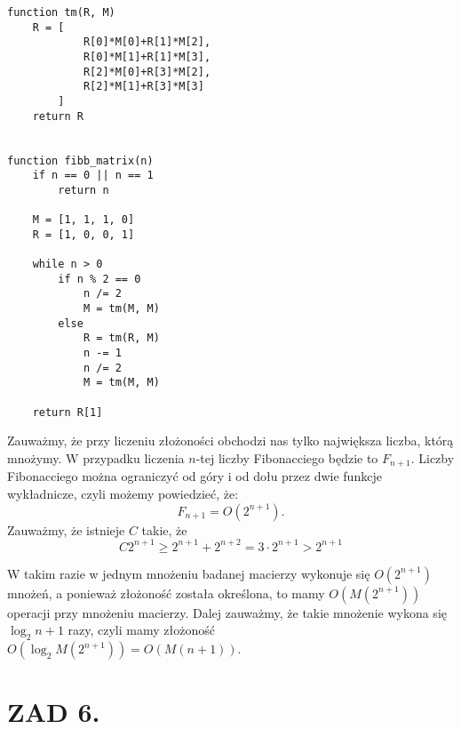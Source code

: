 \documentclass{article}[13pt]
\begin{document}
\begin{lstlisting}[language=juleczka]
function tm(R, M)
    R = [
            R[0]*M[0]+R[1]*M[2], 
            R[0]*M[1]+R[1]*M[3], 
            R[2]*M[0]+R[3]*M[2], 
            R[2]*M[1]+R[3]*M[3]
        ]
    return R


function fibb_matrix(n)
    if n == 0 || n == 1
        return n
    
    M = [1, 1, 1, 0]
    R = [1, 0, 0, 1]

    while n > 0
        if n % 2 == 0
            n /= 2
            M = tm(M, M)
        else
            R = tm(R, M)
            n -= 1
            n /= 2
            M = tm(M, M)
    
    return R[1]
\end{lstlisting}

Zauważmy, że przy liczeniu złożoności obchodzi nas tylko największa liczba, którą mnożymy. W przypadku liczenia $n$-tej liczby Fibonacciego będzie to $F_{n+1}$. Liczby Fibonacciego można ograniczyć od góry i od dołu przez dwie funkcje wykładnicze, czyli możemy powiedzieć, że:
$$F_{n+1}=O(2^{n+1}).$$
Zauważmy, że istnieje $C$ takie, że
$$C2^{n+1}\geq 2^{n+1}+2^{n+2}=3\cdot2^{n+1}>2^{n+1}$$

W takim razie w jednym mnożeniu badanej macierzy wykonuje się $O(2^{n+1})$ mnożeń, a ponieważ złożoność została określona, to mamy $O(M(2^{n+1}))$ operacji przy mnożeniu macierzy. Dalej zauważmy, że takie mnożenie wykona się $\log_2 n+1$ razy, czyli mamy złożoność \\
$O(\log_2M(2^{n+1}))=O(M(n+1))$.

\section*{ZAD 6.}
\end{document}
